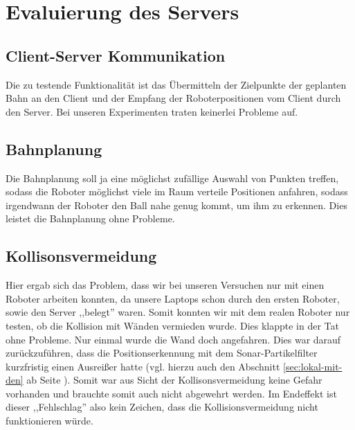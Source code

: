 \section{Evaluierung des Servers}
\label{sec:eval-des-serv}
%

%
\subsection{Client-Server Kommunikation}
Die zu testende Funktionalität ist das Übermitteln der Zielpunkte der
geplanten Bahn an den Client und der Empfang der Roboterpositionen vom
Client durch den Server. Bei unseren Experimenten traten keinerlei
Probleme auf. 
\subsection{Bahnplanung}
Die Bahnplanung soll ja eine möglichst zufällige Auswahl von Punkten
treffen, sodass die Roboter möglichst viele im Raum verteile
Positionen anfahren, sodass irgendwann der Roboter den Ball nahe genug
kommt, um ihm zu erkennen. Dies leistet die Bahnplanung ohne Probleme.
\subsection{Kollisonsvermeidung}
Hier ergab sich das Problem, dass wir bei unseren Versuchen nur mit
einen Roboter arbeiten konnten, da unsere Laptops schon durch den
ersten Roboter, sowie den Server ,,belegt'' waren. Somit konnten wir
mit dem realen Roboter nur testen, ob die Kollision mit Wänden
vermieden wurde. Dies klappte in der Tat ohne Probleme. Nur einmal
wurde die Wand doch angefahren. Dies war darauf zurückzuführen, dass
die Positionserkennung mit dem Sonar-Partikelfilter kurzfristig einen
Ausreißer hatte (vgl. hierzu auch den Abschnitt
\ref{sec:lokal-mit-den} ab Seite \pageref{sec:lokal-mit-den}). Somit
war aus Sicht der Kollisonsvermeidung keine Gefahr vorhanden und
brauchte somit auch nicht abgewehrt werden. Im Endeffekt ist dieser
,,Fehlschlag'' also kein Zeichen, dass die Kollisionsvermeidung nicht
funktionieren würde. \\\\
%
